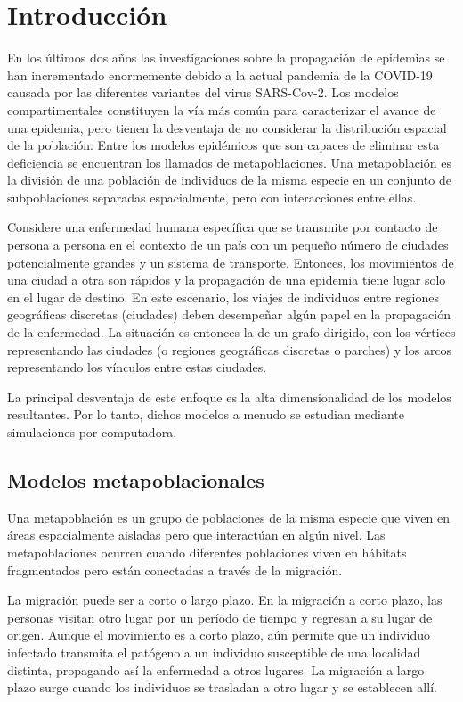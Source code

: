 \documentclass[a4paper,10pt,twocolumn]{article}
\begin{document}
\section{Introducción}\label{sec:intro}

En los últimos dos años las investigaciones sobre la propagación de epidemias se han incrementado enormemente
debido a la actual pandemia de la COVID-19 causada por las diferentes variantes del virus SARS-Cov-2. Los modelos
compartimentales constituyen la vía más común para caracterizar el avance de una epidemia, pero tienen la desventaja
de no considerar la distribución espacial de la población. Entre los modelos epidémicos que son capaces de eliminar
esta deficiencia se encuentran los llamados de metapoblaciones. Una metapoblación es la división de una población
de individuos de la misma especie en un conjunto de subpoblaciones separadas espacialmente, pero con interacciones
entre ellas.

Considere una enfermedad humana específica que se transmite por contacto de persona a persona en el contexto de un país con un pequeño número de ciudades potencialmente grandes y un sistema de transporte. Entonces, los movimientos de una ciudad a otra son rápidos y la propagación de una epidemia tiene lugar solo en el lugar de destino. En este escenario, los viajes de individuos entre regiones geográficas discretas (ciudades) deben desempeñar algún papel en la propagación de la enfermedad. La situación es entonces la de un grafo dirigido, con los vértices representando las ciudades (o regiones geográficas discretas o parches) y los arcos representando los vínculos entre estas ciudades.

La principal desventaja de este enfoque es la alta dimensionalidad de los modelos resultantes. Por lo tanto, dichos modelos a menudo se estudian mediante simulaciones por computadora.

\subsection{Modelos metapoblacionales}
Una metapoblación es un grupo de poblaciones de la misma especie que viven en áreas espacialmente aisladas pero que interactúan en algún nivel. Las metapoblaciones ocurren cuando diferentes poblaciones viven en hábitats fragmentados pero están conectadas a través de la migración.

La migraci\'on puede ser a corto o largo plazo. En la migraci\'on a corto plazo, las personas visitan otro lugar por un período de tiempo y regresan a su lugar de origen. Aunque el movimiento es a corto plazo, aún permite que un individuo infectado transmita el patógeno a un individuo susceptible de una localidad distinta, propagando así la enfermedad a otros lugares. La migración a largo plazo surge cuando los individuos se trasladan a otro lugar y se establecen allí.
\end{document}
